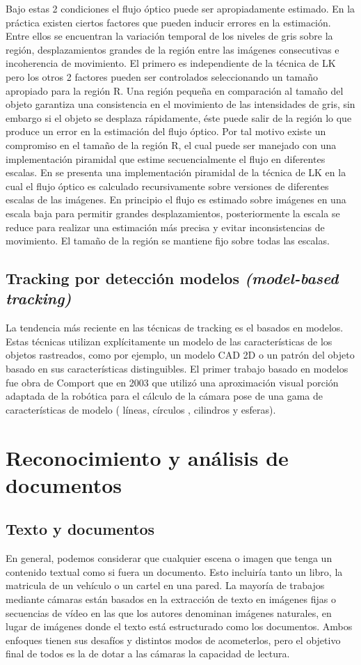 Bajo estas 2 condiciones el flujo óptico puede ser apropiadamente estimado. En la práctica existen ciertos factores que pueden inducir errores en la estimación. Entre ellos se encuentran la variación temporal de los niveles de gris sobre la región, desplazamientos grandes de la región entre las imágenes consecutivas e incoherencia de movimiento. El primero es independiente de la técnica de LK pero los otros 2 factores pueden ser controlados seleccionando un tamaño apropiado para la región R. Una región pequeña en comparación al tamaño del objeto garantiza una consistencia en el movimiento de las intensidades de gris, sin embargo si el objeto se desplaza rápidamente, éste puede salir de la región lo que produce un error en la estimación del flujo óptico. Por tal motivo existe un compromiso en el tamaño de la región R, el cual puede ser manejado con una implementación piramidal que estime  secuencialmente el flujo en diferentes escalas. En \cite{Bouguet} se presenta una implementación piramidal de la técnica de LK en la cual el flujo óptico es calculado recursivamente sobre versiones de diferentes escalas de las imágenes. En principio el flujo es estimado sobre imágenes en una escala baja para permitir grandes desplazamientos, posteriormente la escala se reduce para realizar una estimación más precisa  y evitar inconsistencias de movimiento. El tamaño de la región se mantiene fijo sobre todas las escalas.

\subsection{Tracking por detección modelos \emph{(model-based tracking)}}
La tendencia más reciente en las técnicas de tracking es el basados en modelos. Estas técnicas utilizan explícitamente un modelo de las características de los objetos rastreados, como por ejemplo, un modelo CAD 2D o un patrón del objeto basado en sus características distinguibles. El primer trabajo basado en modelos fue obra de Comport \cite{Comport} que en 2003 que utilizó una aproximación visual porción adaptada de la robótica para el cálculo de la cámara pose de una gama de características de modelo ( líneas, círculos , cilindros y esferas). 

\section{Reconocimiento y análisis de documentos}

\subsection{Texto y documentos}
En general, podemos considerar que cualquier escena o imagen que tenga un contenido textual como si fuera un documento. Esto incluiría tanto un libro, la matricula de un vehículo o un cartel en una pared. La mayoría de trabajos mediante cámaras están basados en la extracción de texto en imágenes fijas o secuencias de vídeo en las que los autores denominan imágenes naturales, en lugar de imágenes donde el texto está estructurado como los documentos. Ambos enfoques tienen sus desafíos y distintos modos de acometerlos, pero el objetivo final de todos es la de dotar a las cámaras la capacidad de lectura.


